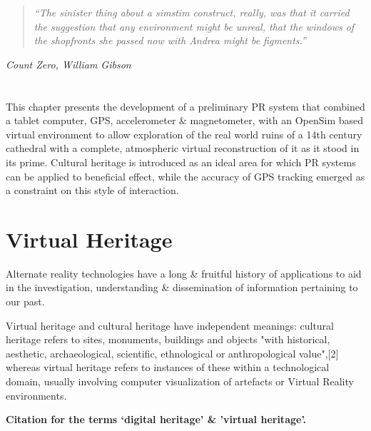 \begin{quote}
	\textit{``The sinister thing about a simstim construct, really, was that it carried the suggestion that any environment might be unreal, that the windows of the shopfronts she passed now with Andrea might be figments.''}
\end{quote}
\hfill \textit{Count Zero, William Gibson}
\\
\\
\\


This chapter presents the development of a preliminary PR system that combined a tablet computer, GPS, accelerometer \& magnetometer, with an OpenSim based virtual environment to allow exploration of the real world ruins of a 14th century cathedral with a complete, atmospheric virtual reconstruction of it as it stood in its prime. Cultural heritage is introduced as an ideal area for which PR systems can be applied to beneficial effect, while the accuracy of GPS tracking emerged as a constraint on this style of interaction.


\section{Virtual Heritage}

Alternate reality technologies have a long \& fruitful history of applications to aid in the investigation, understanding \& dissemination of information pertaining to our past.


Virtual heritage and cultural heritage have independent meanings: cultural heritage refers to sites, monuments, buildings and objects "with historical, aesthetic, archaeological, scientific, ethnological or anthropological value",[2] whereas virtual heritage refers to instances of these within a technological domain, usually involving computer visualization of artefacts or Virtual Reality environments.

\textbf{Citation for the terms `digital heritage' \& 'virtual heritage'.}

